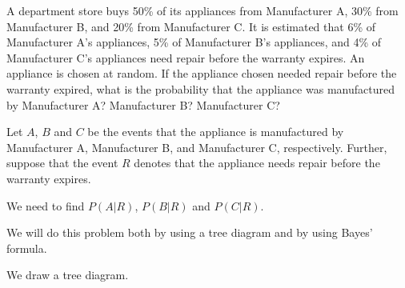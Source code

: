 \begin{example}
    A department store buys 50\% of its appliances from Manufacturer A, 30\% from Manufacturer B, and 20\% from Manufacturer C. It is estimated that 6\% of Manufacturer A's appliances, 5\% of Manufacturer B's appliances, and 4\% of Manufacturer C's appliances need repair before the warranty expires. An appliance is chosen at random. If the appliance chosen needed repair before the warranty expired, what is the probability that the appliance was manufactured by Manufacturer A? Manufacturer B? Manufacturer C?
\end{example}
\begin{solution}
    Let \( A \), \( B \) and \( C \) be the events that the appliance is manufactured by Manufacturer A, Manufacturer B, and Manufacturer C, respectively. Further, suppose that the event \( R \) denotes that the appliance needs repair before the warranty expires.

    We need to find \( P(A | R) \), \( P(B | R) \) and \( P(C | R) \).

    We will do this problem both by using a tree diagram and by using Bayes' formula.

    We draw a tree diagram.



\end{solution}
